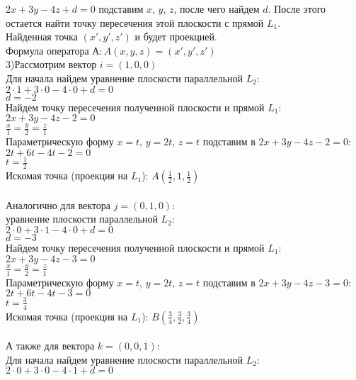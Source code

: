 \documentclass{article}
\begin{document}
    $2x + 3y - 4z + d = 0$ подставим $x$, $y$, $z$, после чего найдем $d$. После этого остается найти точку пересечения этой плоскости с прямой $L_1$. \\
    Найденная точка $(x', y', z')$ и будет проекцией. \\
    Формула оператора $А: A(x, y, z)=(x', y', z')$\\
    3)Рассмотрим вектор $i =(1, 0, 0)$ \\
    Для начала найдем уравнение плоскости параллельной $L_2$: \\
    $2 \cdot 1 + 3 \cdot 0 - 4 \cdot 0 + d = 0$\\
    $d = -2$\\
    Найдем точку пересечения полученной плоскости и прямой $L_1$:\\
    $2x + 3y - 4z - 2 = 0$\\
    $\frac{x}{1}=\frac{y}{2}=\frac{z}{1}$\\
    Параметрическую форму $x=t$, $y=2t$, $z=t$ подставим в $2x + 3y - 4z - 2 = 0$:\\
    $2t + 6t - 4t - 2 = 0$\\
    $t = \frac{1}{2}$\\
    Искомая точка (проекция на $L_1$): $A(\frac{1}{2}, 1, \frac{1}{2})$\\
    \\
    Аналогично для вектора $j =(0, 1, 0)$:\\
    уравнение плоскости параллельной $L_2$:\\
    $2 \cdot 0 + 3 \cdot 1 - 4 \cdot 0 + d = 0$\\
    $d = -3$\\
    Найдем точку пересечения полученной плоскости и прямой $L_1$:\\
    $2x + 3y - 4z - 3 = 0$\\
    $\frac{x}{1}=\frac{y}{2}=\frac{z}{1}$\\
    Параметрическую форму $x=t$, $y=2t$, $z=t$ подставим в $2x + 3y - 4z - 3 = 0$:\\
    $2t + 6t - 4t - 3 = 0$\\
    $t = \frac{3}{4}$\\
    Искомая точка (проекция на $L_1$): $B(\frac{3}{4}, \frac{3}{2}, \frac{3}{4})$\\
    \\
    А также для вектора $k =(0,0,1)$:\\
    Для начала найдем уравнение плоскости параллельной $L_2$:\\
    $2 \cdot 0 + 3 \cdot 0 - 4 \cdot 1 + d = 0$\\
\end{document}
